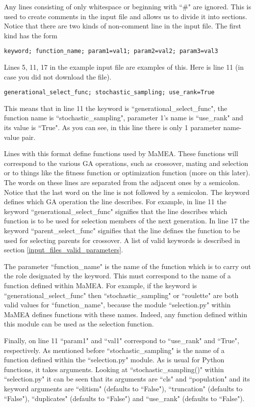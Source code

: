 \documentclass{article}
\begin{document}
Any lines consisting of only whitespace or beginning with ``\#" are ignored. This is used to create comments in the input file and allows us to divide it into sections. Notice that there are two kinds of non-comment line in the input file. The first kind has the form
\begin{verbatim}
keyword; function_name; param1=val1; param2=val2; param3=val3
\end{verbatim}
Lines 5, 11, 17 in the example input file are examples of this. Here is line 11 (in case you did not download the file).
\begin{verbatim}
generational_select_func; stochastic_sampling; use_rank=True
\end{verbatim}
This means that in line 11 the keyword is ``generational\_select\_func", the function name is ``stochastic\_sampling", parameter 1's name is ``use\_rank" and its value is ``True". As you can see, in this line there is only 1 parameter name-value pair.

Lines with this format define functions used by MaMEA. These functions will correspond to the various GA operations, such as crossover, mating and selection or to things like the fitness function or optimization function (more on this later). The words on these lines are separated from the adjacent ones by a semicolon. Notice that the last word on the line is not followed by a semicolon. The keyword defines which GA operation the line describes. For example, in line 11 the keyword ``generational\_select\_func" signifies that the line describes which function is to be used for selection members of the next generation. In line 17 the keyword ``parent\_select\_func" signifies that the line defines the function to be used for selecting parents for crossover. A list of valid keywords is described in section \ref{input_files_valid_parameters}.

The parameter ``function\_name" is the name of the function which is to carry out the role designated by the keyword. This must correspond to the name of a function defined within MaMEA. For example, if the keyword is ``generational\_select\_func" then ``stochastic\_sampling" or ``roulette" are both valid values for ``function\_name", because the module ``selection.py" within MaMEA defines functions with these names. Indeed, any function defined within this module can be used as the selection function.

Finally, on line 11 ``param1" and ``val1" correspond to ``use\_rank" and ``True", respectively. As mentioned before ``stochastic\_sampling" is the name of a function defined within the ``selection.py" module. As is usual for Python functions, it takes arguments. Looking at ``stochastic\_sampling()" within ``selection.py" it can be seen that its arguments are ``cls" and ``population" and its keyword arguments are ``elitism" (defaults to ``False"), ``truncation" (defaults to ``False"), ``duplicates" (defaults to ``False") and ``use\_rank" (defaults to ``False").
\end{document}
